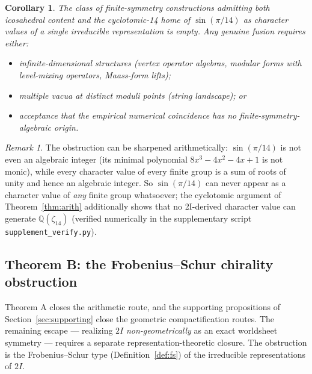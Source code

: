 \documentclass[11pt,a4paper]{amsart}
\newtheorem*{maincorollary}{Corollary}
\theoremstyle{definition}
\theoremstyle{remark}
\newtheorem{remark}[theorem]{Remark}
\newcommand{\bbQ}{\mathbb{Q}}
\begin{document}
\begin{maincorollary}
The class of finite-symmetry constructions admitting both icosahedral content
and the cyclotomic-14 home of $\sin(\pi/14)$ as character values of a single
irreducible representation is empty. Any genuine fusion requires either:
\begin{itemize}
  \item infinite-dimensional structures (vertex operator algebras, modular
        forms with level-mixing operators, Maass-form lifts);
  \item multiple vacua at distinct moduli points (string landscape); or
  \item acceptance that the empirical numerical coincidence has no
        finite-symmetry-algebraic origin.
\end{itemize}
\end{maincorollary}

\begin{remark}
The obstruction can be sharpened arithmetically: $\sin(\pi/14)$ is not even
an algebraic integer (its minimal polynomial $8x^3 - 4x^2 - 4x + 1$ is not
monic), while every character value of every finite group is a sum of roots
of unity and hence an algebraic integer. So $\sin(\pi/14)$ can never appear
as a character value of \emph{any} finite group whatsoever; the cyclotomic
argument of Theorem~\ref{thm:arith} additionally shows that no 2I-derived
character value can generate $\bbQ(\zeta_{14})$ (verified numerically in the
supplementary script \texttt{supplement\_verify.py}).
\end{remark}

\subsection{Theorem B: the Frobenius--Schur chirality obstruction}

Theorem A closes the arithmetic route, and the supporting propositions of
Section~\ref{sec:supporting} close the geometric compactification routes.
The remaining escape --- realizing $2I$ \emph{non-geometrically} as an exact
worldsheet symmetry --- requires a separate representation-theoretic closure.
The obstruction is the Frobenius--Schur type (Definition~\ref{def:fs}) of
the irreducible representations of $2I$.
\end{document}
